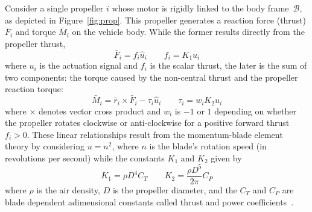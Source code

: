 \documentclass[review]{elsarticle}
\begin{document}
Consider a single propeller $i$ whose motor is rigidly linked to the
body frame~$\mathcal{B}$, as depicted in Figure~\ref{fig:prop}.  This
propeller  generates a reaction force (thrust) $\bar{F}_i$ and  torque
$\bar{M}_i$ on the vehicle body.
While the former results directly from the
propeller thrust,
\begin{equation}
  \label{eq:Fi}
  \bar{F}_i = f_i \hat{u}_i \qquad %
  f_i = K_1 u_i
\end{equation}
where $u_i$ is the actuation signal and $f_i$ is the scalar thrust,
the later is the sum of two components: the torque caused by the
non-central thrust
and the propeller reaction torque:
\begin{equation}
  \label{eq:Mi}
  \bar{M}_i = \bar{r}_i\times\bar{F}_i - \tau_i \hat{u}_i \qquad
  \tau_i = w_i K_2 u_i
\end{equation}
where $\times$ denotes vector cross product and $w_i$ is $-1$ or $1$
depending on whether the propeller rotates clockwise or anti-clockwise
for a positive forward thrust $f_i>0$.  These linear relationships
result from the momentum-blade element theory by considering $u=n^2$,
where $n$ is the blade's rotation speed (in revolutions per second) while the
constants $K_1$ and $K_2$ given by
\begin{equation}
  \label{eq:blade}
  K_1 = \rho D^4 C_T \qquad K_2 = \frac{\rho D^5}{2\pi} C_P
\end{equation}
where $\rho$ is the air density, $D$ is the propeller diameter, and
the $C_T$ and $C_P$ are blade dependent adimensional constants called
thrust and power coefficients~\cite{mccormick95}.
\end{document}
